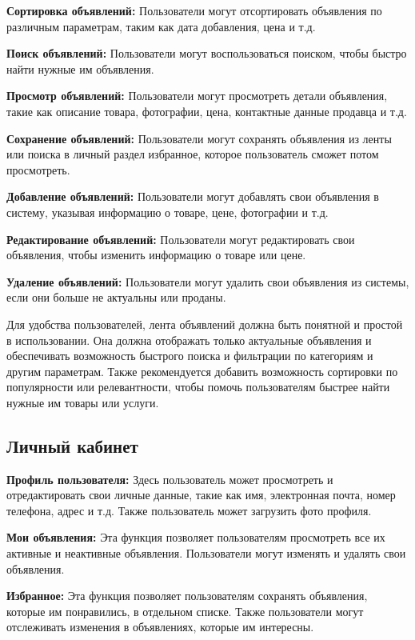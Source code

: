     \textbf{Сортировка объявлений:} Пользователи могут отсортировать объявления по различным параметрам, таким как дата добавления, цена и т.д.

    \textbf{Поиск объявлений:} Пользователи могут воспользоваться поиском, чтобы быстро найти нужные им объявления.

    \textbf{Просмотр объявлений:} Пользователи могут просмотреть детали объявления, такие как описание товара, фотографии, цена, контактные данные продавца и т.д.

    \textbf{Сохранение объявлений:} Пользователи могут сохранять объявления из ленты или поиска в личный раздел избранное, которое пользователь сможет потом просмотреть. 

    \textbf{Добавление объявлений:} Пользователи могут добавлять свои объявления в систему, указывая информацию о товаре, цене, фотографии и т.д.

    \textbf{Редактирование объявлений:} Пользователи могут редактировать свои объявления, чтобы изменить информацию о товаре или цене.

    \textbf{Удаление объявлений:} Пользователи могут удалить свои объявления из системы, если они больше не актуальны или проданы.

    Для удобства пользователей, лента объявлений должна быть понятной и простой в использовании. Она должна отображать только актуальные объявления и обеспечивать возможность быстрого поиска и фильтрации по категориям и другим параметрам. Также рекомендуется добавить возможность сортировки по популярности или релевантности, чтобы помочь пользователям быстрее найти нужные им товары или услуги.


\subsection{Личный кабинет}

    \textbf{Профиль пользователя:} Здесь пользователь может просмотреть и отредактировать свои личные данные, такие как имя, электронная почта, номер телефона, адрес и т.д. Также пользователь может загрузить фото профиля.

    \textbf{Мои объявления:} Эта функция позволяет пользователям просмотреть все их активные и неактивные объявления. Пользователи могут изменять и удалять свои объявления.

    \textbf{Избранное:} Эта функция позволяет пользователям сохранять объявления, которые им понравились, в отдельном списке. Также пользователи могут отслеживать изменения в объявлениях, которые им интересны.

